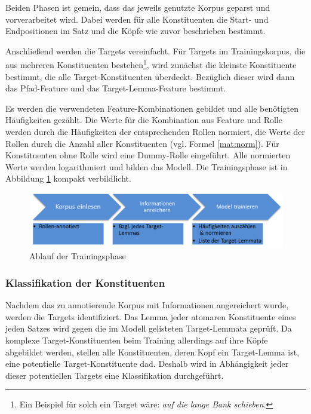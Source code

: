 \documentclass[12pt]{article}
\begin{document}
Beiden Phasen ist gemein, dass das jeweils genutzte Korpus geparst und vorverarbeitet wird. Dabei werden für alle Konstituenten die Start- und Endpositionen im Satz und die Köpfe wie zuvor beschrieben bestimmt.

Anschließend werden die Targets vereinfacht. Für Targets im Trainingskorpus, die aus mehreren Konstituenten bestehen\footnote{Ein Beispiel für solch ein Target wäre: \textit{auf die lange Bank schieben}.}, wird zunächst die kleinste Konstituente bestimmt, die alle Target-Konstituenten überdeckt. Bezüglich dieser wird dann das Pfad-Feature und das Target-Lemma-Feature bestimmt.

Es werden die verwendeten Feature-Kombinationen gebildet und alle benötigten Häufigkeiten gezählt. Die Werte für die Kombination aus Feature und Rolle werden durch die Häufigkeiten der entsprechenden Rollen normiert, die Werte der Rollen durch die Anzahl aller Konstituenten (vgl. Formel \eqref{mat:norm}). Für Konstituenten ohne Rolle wird eine Dummy-Rolle eingeführt. Alle normierten Werte werden logarithmiert und bilden das Modell. Die Trainingsphase ist in Abbildung \ref{training} kompakt verbildlicht. 

\begin{figure}[tb!]
		\centering
		\includegraphics[scale=0.6]{images/ablaufLernen.png}
		\caption{Ablauf der Trainingsphase}
		\label{training}
	\end{figure}


\subsubsection*{Klassifikation der Konstituenten}\label{subsubsec:classify}

Nachdem das zu annotierende Korpus mit Informationen angereichert wurde, werden die Targets identifiziert. Das Lemma jeder atomaren Konstituente eines jeden Satzes wird gegen die im Modell gelisteten Target-Lemmata geprüft. Da komplexe Target-Konstituenten beim Training allerdings auf ihre Köpfe abgebildet werden, stellen alle Konstituenten, deren Kopf ein Target-Lemma ist, eine potentielle Target-Konstituente dad. Deshalb wird in Abhängigkeit jeder dieser potentiellen Targets eine Klassifikation durchgeführt.
\end{document}
